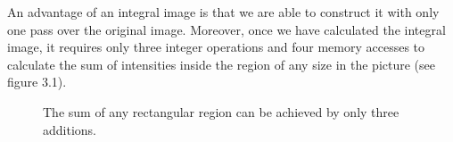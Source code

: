 An advantage of an integral image is that we are able to construct it with only one pass over the original image. 
Moreover, once we have calculated the integral image, it requires only three integer operations and four memory accesses to calculate the sum 
of intensities inside the region of any size in the picture (see figure 3.1).

\begin{figure}
  \caption{The sum of any rectangular region can be achieved by only three additions.}
\end{figure}
